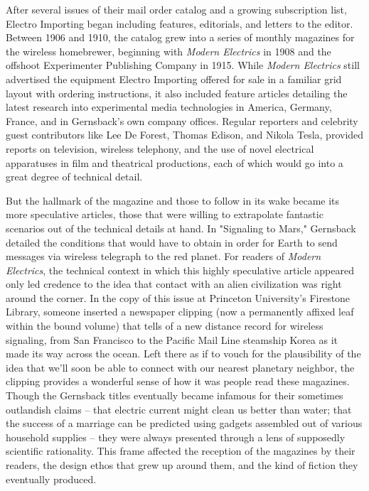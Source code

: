 \documentclass{article}
\begin{document}
After several issues of their mail order catalog and a growing subscription list, Electro Importing began including features, editorials, and letters to the editor.  Between 1906 and 1910, the catalog grew into a series of monthly magazines for the wireless homebrewer, beginning with \textit{Modern Electrics} in 1908 and the offshoot Experimenter Publishing Company in 1915.  While \textit{Modern Electrics} still advertised the equipment Electro Importing offered for sale in a familiar grid layout with ordering instructions, it also included feature articles detailing the latest research into experimental media technologies in America, Germany, France, and in Gernsback's own company offices.  Regular reporters and celebrity guest contributors like Lee De Forest, Thomas Edison, and Nikola Tesla, provided reports on television, wireless telephony, and the use of novel electrical apparatuses in film and theatrical productions, each of which would go into a great degree of technical detail.

But the hallmark of the magazine and those to follow in its wake became its more speculative articles, those that were willing to extrapolate fantastic scenarios out of the technical details at hand.  In "Signaling to Mars," Gernsback detailed the conditions that would have to obtain in order for Earth to send messages via wireless telegraph to the red planet.  For readers of \textit{Modern Electrics}, the technical context in which this highly speculative article appeared only led credence to the idea that contact with an alien civilization was right around the corner.  In the copy of this issue at Princeton University's Firestone Library, someone inserted a newspaper clipping (now a permanently affixed leaf within the bound volume) that tells of a new distance record for wireless signaling, from San Francisco to the Pacific Mail Line steamship Korea as it made its way across the ocean.  Left there as if to vouch for the plausibility of the idea that we'll soon be able to connect with our nearest planetary neighbor, the clipping provides a wonderful sense of how it was people read these magazines.  Though the Gernsback titles eventually became infamous for their sometimes outlandish claims -- that electric current might clean us better than water; that the success of a marriage can be predicted using gadgets assembled out of various household supplies -- they were always presented through a lens of supposedly scientific rationality.  This frame affected the reception of the magazines by their readers, the design ethos that grew up around them, and the kind of fiction they eventually produced.
\end{document}

